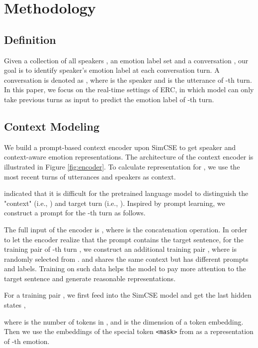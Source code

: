 \documentclass[11pt]{article}
\begin{document}
\section{Methodology}

\subsection{Definition}

Given a collection of all speakers , an emotion label set  and a conversation , our goal is to identify speaker's emotion label at each conversation turn. A conversation is denoted as , where  is the speaker and  is the utterance of -th turn. In this paper, we focus on the real-time settings of ERC, in which model can only take previous turns  as input to predict the emotion label  of -th turn.

\subsection{Context Modeling}
\label{sec32}
We build a prompt-based context encoder upon SimCSE\cite{gao2021simcse} to get speaker and context-aware emotion representations. The architecture of the context encoder is illustrated in Figure \ref{fig:encoder}. To calculate representation for , we use the most recent  turns of utterances and speakers as context.

\citet{kim2021emoberta} indicated that it is difficult for the pretrained language model to distinguish the "context" (i.e., ) and target turn (i.e., ). Inspired by prompt learning\cite{liu2021pre}, we construct a prompt for the -th turn as follows.

The full input of the encoder is , where  is the concatenation operation. In order to let the encoder realize that the prompt contains the target sentence, for the training pair of -th turn  , we construct an additional training pair , where  is randomly selected from .  and  shares the same context but has different prompts and labels. Training on such data helps the model to pay more attention to the target sentence and generate reasonable representations.

For a training pair , we first feed  into the SimCSE model and get the last hidden states ,

where  is the number of tokens in , and  is the dimension of a token embedding.
Then we use the embeddings of the special token \texttt{<mask>} from  as a representation of -th emotion.
\end{document}
